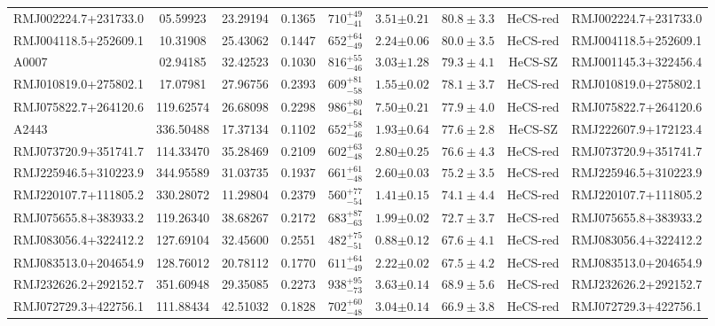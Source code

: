 \begin{table*}[th]
\begin{center}
\begin{tabular}{lcccccccc}
 RMJ002224.7+231733.0 & 05.59923 & 23.29194 & 0.1365  & $ 710 ^{+49} _{-41}$ & $ 3.51 {\pm 0.21} $ & $ 80.8 \pm{3.3} $ & HeCS-red & RMJ002224.7+231733.0    \\ 
 RMJ004118.5+252609.1 & 10.31908 & 25.43062 & 0.1447  & $ 652 ^{+64} _{-49}$ & $ 2.24 {\pm 0.06} $ & $ 80.0 \pm{3.5} $ & HeCS-red & RMJ004118.5+252609.1    \\ 
 A0007 & 02.94185 & 32.42523 & 0.1030  & $ 816 ^{+55} _{-46}$ & $ 3.03 {\pm 1.28} $ & $ 79.3 \pm{4.1} $ & HeCS-SZ & RMJ001145.3+322456.4    \\ 
 RMJ010819.0+275802.1 & 17.07981 & 27.96756 & 0.2393  & $ 609 ^{+81} _{-58}$ & $ 1.55 {\pm 0.02} $ & $ 78.1 \pm{3.7} $ & HeCS-red & RMJ010819.0+275802.1    \\ 
 RMJ075822.7+264120.6 & 119.62574 & 26.68098 & 0.2298  & $ 986 ^{+80} _{-64}$ & $ 7.50 {\pm 0.21} $ & $ 77.9 \pm{4.0} $ & HeCS-red & RMJ075822.7+264120.6    \\ 
 A2443 & 336.50488 & 17.37134 & 0.1102  & $ 652 ^{+58} _{-46}$ & $ 1.93 {\pm 0.64} $ & $ 77.6 \pm{2.8} $ & HeCS-SZ & RMJ222607.9+172123.4    \\ 
 RMJ073720.9+351741.7 & 114.33470 & 35.28469 & 0.2109  & $ 602 ^{+63} _{-48}$ & $ 2.80 {\pm 0.25} $ & $ 76.6 \pm{4.3} $ & HeCS-red & RMJ073720.9+351741.7   \\ 
 RMJ225946.5+310223.9 & 344.95589 & 31.03735 & 0.1937  & $ 661 ^{+61} _{-48}$ & $ 2.60 {\pm 0.03} $ & $ 75.2 \pm{3.5} $ & HeCS-red & RMJ225946.5+310223.9   \\ 
 RMJ220107.7+111805.2 & 330.28072 & 11.29804 & 0.2379  & $ 560 ^{+77} _{-54}$ & $ 1.41 {\pm 0.15} $ & $ 74.1 \pm{4.4} $ & HeCS-red & RMJ220107.7+111805.2   \\ 
 RMJ075655.8+383933.2 & 119.26340 & 38.68267 & 0.2172  & $ 683 ^{+87} _{-63}$ & $ 1.99 {\pm 0.02} $ & $ 72.7 \pm{3.7} $ & HeCS-red & RMJ075655.8+383933.2   \\ 
 RMJ083056.4+322412.2 & 127.69104 & 32.45600 & 0.2551  & $ 482 ^{+75} _{-51}$ & $ 0.88 {\pm 0.12} $ & $ 67.6 \pm{4.1} $ & HeCS-red & RMJ083056.4+322412.2   \\ 
 RMJ083513.0+204654.9 & 128.76012 & 20.78112 & 0.1770  & $ 611 ^{+64} _{-49}$ & $ 2.22 {\pm 0.02} $ & $ 67.5 \pm{4.2} $ & HeCS-red & RMJ083513.0+204654.9   \\ 
 RMJ232626.2+292152.7 & 351.60948 & 29.35085 & 0.2273  & $ 938 ^{+95} _{-73}$ & $ 3.63 {\pm 0.14} $ & $ 68.9 \pm{5.6} $ & HeCS-red & RMJ232626.2+292152.7   \\ 
 RMJ072729.3+422756.1 & 111.88434 & 42.51032 & 0.1828  & $ 702 ^{+60} _{-48}$ & $ 3.04 {\pm 0.14} $ & $ 66.9 \pm{3.8} $ & HeCS-red & RMJ072729.3+422756.1   \\ 

\end{tabular}
\end{center}
\end{table*}

